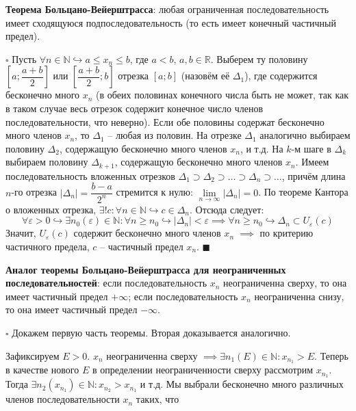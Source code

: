 \documentclass[12pt, a4paper, reqno]{article}
\begin{document}
    \textbf{Теорема Больцано-Вейерштрасса}: любая ограниченная последовательность имеет сходящуюся
    подпоследовательность (то есть имеет конечный частичный предел).

    $\square$ Пусть $\forall n\in\mathbb{N} \hookrightarrow a \leq x_n \leq b$, где $a < b$,
    $a, b \in\mathbb{R}$. Выберем ту половину $\left[a; \dfrac{a + b}{2}\right]$ или
    $\left[\dfrac{a + b}{2}; b\right]$ отрезка $[a; b]$ (назовём её $\Delta_1$), где содержится
    бесконечно много $x_n$ (в обеих половинах конечного числа быть не может, так как в таком случае
    весь отрезок содержит конечное число членов последовательности, что неверно). Если обе половины
    содержат бесконечно много членов $x_n$, то $\Delta_1$ -- любая из половин. На отрезке $\Delta_1$
    аналогично выбираем половину $\Delta_2$, содержащую бесконечно много членов $x_n$, и т.д. На
    $k$-м шаге в $\Delta_k$ выбираем половину $\Delta_{k+1}$, содержащую бесконечно много членов
    $x_n$. Имеем последовательность вложенных отрезков $\Delta_1 \supset \Delta_2 \supset \ldots\supset
    \Delta_n \supset \ldots$, причём длина $n$-го отрезка $|\Delta_n| = \dfrac{b-a}{2^n}$ стремится
    к нулю: $\lim\limits_{n\to\infty} |\Delta_n| = 0$.
    По теореме Кантора о вложенных отрезка, $\exists! c: \forall n\in\mathbb{N} \hookrightarrow
    c\in\Delta_n$. Отсюда следует:
    \begin{equation*}
        \forall\varepsilon > 0 \hookrightarrow \exists n_0(\varepsilon)\in\mathbb{N}: \forall n \geq
        n_0 \hookrightarrow |\Delta_n| < \varepsilon \implies
        \forall n \geq n_0 \hookrightarrow \Delta_n \subset U_{\varepsilon}(c)
    \end{equation*}
    Значит, $U_{\varepsilon}(c)$ содержит бесконечно много членов $x_n$ $\implies$ по критерию
    частичного предела, $c$ -- частичный предел $x_n$. $\blacksquare$

    \textbf{Аналог теоремы Больцано-Вейерштрасса для неограниченных последовательностей}: если
    последовательность $x_n$ неограниченна сверху, то она имеет частичный предел $+\infty$; если
    последовательность $x_n$ неограниченна снизу, то она имеет частичный предел $-\infty$.

    $\square$ Докажем первую часть теоремы. Вторая доказывается аналогично.

    Зафиксируем $E > 0$. $x_n$ неограниченна сверху $\implies \exists n_1(E)\in\mathbb{N}: x_{n_1} > E$.
    Теперь в качестве нового $E$ в определении неограниченности сверху рассмотрим $x_{n_1}$. Тогда
    $\exists n_2(x_{n_1})\in\mathbb{N}: x_{n_2} > x_{n_1}$ и т.д. Мы выбрали бесконечно много
    различных членов последовательности $x_n$ таких, что
\end{document}
